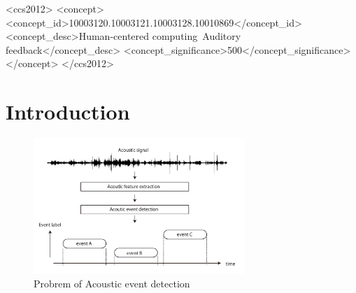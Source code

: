 \documentclass[sigchi]{acmart}
\begin{document}
%
%
\begin{CCSXML}
<ccs2012>
<concept>
<concept_id>10003120.10003121.10003128.10010869</concept_id>
<concept_desc>Human-centered computing~Auditory feedback</concept_desc>
<concept_significance>500</concept_significance>
</concept>
</ccs2012>
\end{CCSXML}


%

%

%
\maketitle

\section{Introduction}

\begin{figure}[h]
  \centering
  \includegraphics[width=8cm]{fig/aed_fig.pdf}
  \caption{Probrem of Acoustic event detection}
  \Description{}
  \label{aed}
\end{figure}
\end{document}
